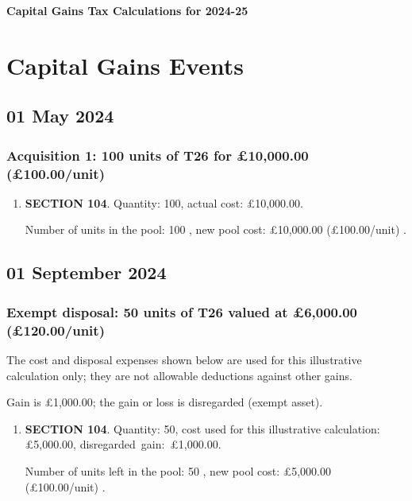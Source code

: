 \documentclass{article}
\begin{document}
\centerline{\Large\bfseries Capital Gains Tax Calculations for 2024-25}

\section*{Capital Gains Events}


\subsection*{01 May 2024}
\subsubsection*{
    Acquisition 1: 100 units of T26 for £10,000.00
    (£100.00/unit)%
}

\begin{enumerate}
\item \textbf{SECTION 104}. Quantity: 100,
    actual cost: £10,000.00.

    Number of units in the pool:
    100%
,
    new pool cost: £10,000.00
    (£100.00/unit)%
.

\end{enumerate}



\subsection*{01 September 2024}
\subsubsection*{
    Exempt disposal: 50 units of T26 valued at £6,000.00
    (£120.00/unit)%
}
The cost and disposal expenses shown below are used for this illustrative calculation only;
they are not allowable deductions against other gains.

Gain is £1,000.00; the gain or loss is disregarded (exempt asset).

\begin{enumerate}
\item \textbf{SECTION 104}. Quantity: 50,
    cost used for this illustrative
    calculation:
    £5,000.00,
    \mbox{disregarded gain: £1,000.00.}

    Number of units left in the pool:
    50%
,
    new pool cost: £5,000.00
    (£100.00/unit)%
.

\end{enumerate}
\end{document}
